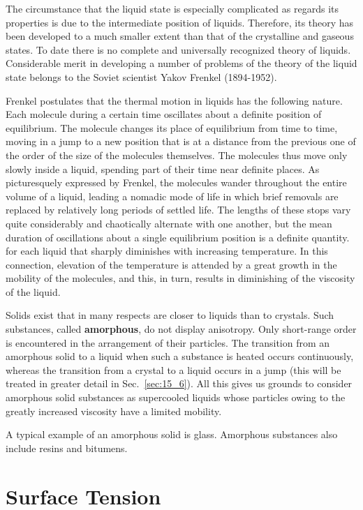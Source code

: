 The circumstance that the liquid state is especially complicated as regards its properties is due to the intermediate position of liquids. Therefore, its theory has been developed to a much smaller extent than that of the crystalline and gaseous states. To date there is no complete and universally recognized theory of liquids. Considerable merit in developing a number of problems of the theory of the liquid state belongs to the Soviet scientist Yakov Frenkel (1894-1952).

Frenkel postulates that the thermal motion in liquids has the following nature. Each molecule during a certain time oscillates about a definite position of equilibrium. The molecule changes its place of equilibrium from time to time, moving in a jump to a new position that is at a distance from the previous one of the order of the size of the molecules themselves. The molecules thus move only slowly inside a liquid, spending part of their time near definite places. As picturesquely expressed by Frenkel, the molecules wander throughout the entire volume of a liquid, leading a nomadic mode of life in which brief removals are replaced by relatively long periods of settled life. The lengths of these stops vary quite considerably and chaotically alternate with one another, but the mean duration of oscillations about a single equilibrium position is a definite quantity. for each liquid that sharply diminishes with increasing temperature. In this connection, elevation of the temperature is attended by a great growth in the mobility of the molecules, and this, in turn, results in diminishing of the viscosity of the liquid.

Solids exist that in many respects are closer to liquids than to crystals. Such substances, called \textbf{amorphous}, do not display anisotropy. Only short-range order is encountered in the arrangement of their particles. The transition from an amorphous solid to a liquid when such a substance is heated occurs continuously, whereas the transition from a crystal to a liquid occurs in a jump (this will be treated in greater detail in Sec.~\ref{sec:15_6}). All this gives us grounds to consider amorphous solid substances as supercooled liquids whose particles owing to the greatly increased viscosity have a limited mobility.

A typical example of an amorphous solid is glass. Amorphous substances also include resins and bitumens.

\section{Surface Tension}\label{sec:14_2}

